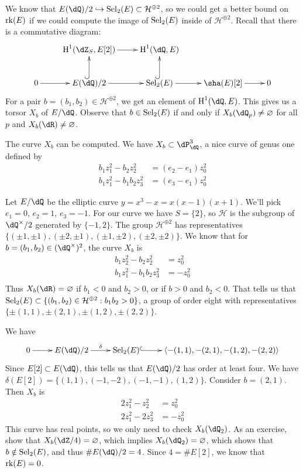 \begin{example}[descent]
We know that $E(\dQ)/2\hookrightarrow \selmer_2(E)\subset \mathcal H^{\oplus 2}$, 
so we could get a better bound on $\operatorname{rk}(E)$ if we could compute 
the image of $\operatorname{Sel}_2(E)$ inside of $\mathcal H^{\oplus 2}$. Recall that there 
is a commutative diagram:
\[\xymatrix{
  & \h^1(\dZ_S,E[2]) \ar[r] 
    & \h^1(\dQ,E) \\
  0 \ar[r] 
    & E(\dQ)/2 \ar[r] \ar@{^{(}->}[u] 
    & \selmer_2(E) \ar[r] \ar@{^{(}->}[u] 
    & \sha(E)[2] \ar[r]
    & 0
}\]
For a pair $b=(b_1,b_2)\in \mathcal H^{\oplus 2}$, we get an element of 
$\h^1(\dQ,E)$. This gives us a torsor $X_b$ of $E/\dQ$. Observe that 
$b\in \operatorname{Sel}_2(E)$ if and only if $X_b(\dQ_p)\ne \varnothing$ for all $p$ and 
$X_b(\dR)\ne\varnothing$. 

The curve $X_b$ can be computed. We have $X_b\subset \dP_\dQ^3$, a nice curve 
of genus one defined by 
\begin{align*}
  b_1 z_1^2 - b_2 z_2^2 &= (e_2-e_1)z_0^2 \\
  b_1 z_1^2 - b_1 b_2 z_3^2 &= (e_3 -e_1) z_0^2
\end{align*}
\end{example}

\begin{example}
Let $E/\dQ$ be the elliptic curve $y=x^3-x=x(x-1)(x+1)$. We'll pick 
$e_1=0$, $e_2=1$, $e_3=-1$. For our curve we have $S=\{2\}$, so $\mathcal H$ is 
the subgroup of $\dQ^\times/2$ generated by $\{-1,2\}$. The group 
$\mathcal H^{\oplus 2}$ has representatives 
$\{(\pm 1,\pm 1),(\pm 2,\pm 1),(\pm 1,\pm 2),(\pm 2,\pm 2)\}$. We know that for 
$b=(b_1,b_2)\in (\dQ^\times)^2$, the curve $X_b$ is 
\begin{align*}
  b_1 z_2^2 - b_2 z_2^2 &= z_0^2 \\
  b_1 z_1^2 - b_1 b_2 z_3^2&=-z_0^2 \\
\end{align*}
Thus $X_b(\dR)=\varnothing$ if $b_1<0$ and $b_2>0$, or if 
$b>0$ and $b_2<0$. That tells us that 
$\operatorname{Sel}_2(E)\subset \{(b_1,b_2)\in \mathcal H^{\oplus 2}:b_1 b_2>0\}$, a group of 
order eight with representatives $\{\pm (1,1),\pm (2,1),\pm (1,2),\pm (2,2)\}$. 

We have 
\[\xymatrix{
  0 \ar[r] 
    & E(\dQ)/2 \ar[r]^-\delta 
    & \selmer_2(E) \ar@{^{(}->}[r] 
    & \langle-(1,1),-(2,1),-(1,2),-(2,2)\rangle
}\]
Since $E[2]\subset E(\dQ)$, this tells us that $E(\dQ)/2$ has order at least 
four. We have $\delta(E[2])=\{(1,1),(-1,-2),(-1,-1),(1,2)\}$. Consider 
$b=(2,1)$. Then $X_b$ is 
\begin{align*}
  2 z_1^2 - z_2^2 &= z_0^2 \\
  2 z_1^2 - 2 z_3^2 &= -z_0^2
\end{align*}
This curve has real points, so we only need to check $X_b(\dQ_2)$. As an 
exercise, show that $X_b(\dZ/4)=\varnothing$, which implies 
$X_b(\dQ_2)=\varnothing$, which shows that $b\notin \operatorname{Sel}_2(E)$, and thus 
$\# E(\dQ)/2=4$. Since $4=\# E[2]$, we know that $\operatorname{rk}(E)=0$. 
\end{example}










